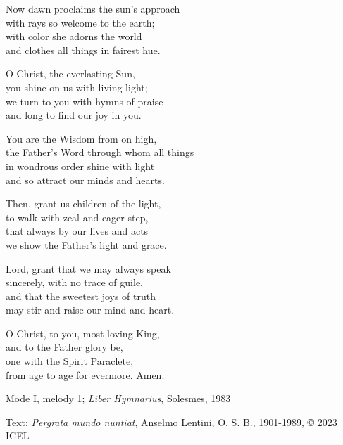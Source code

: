 \hymn

\begin{hymnverse}
Now dawn proclaims the sun’s approach\\
with rays so welcome to the earth;\\
with color she adorns the world\\
and clothes all things in fairest hue.

O Christ, the everlasting Sun,\\
you shine on us with living light;\\
we turn to you with hymns of praise\\
and long to find our joy in you.

You are the Wisdom from on high,\\
the Father’s Word through whom all things\\
in wondrous order shine with light\\
and so attract our minds and hearts.

Then, grant us children of the light,\\
to walk with zeal and eager step,\\
that always by our lives and acts\\
we show the Father’s light and grace.

Lord, grant that we may always speak\\
sincerely, with no trace of guile,\\
and that the sweetest joys of truth\\
may stir and raise our mind and heart.

O Christ, to you, most loving King,\\
and to the Father glory be,\\
one with the Spirit Paraclete,\\
from age to age for evermore. Amen.
\end{hymnverse}

\begin{hymnsource}
Mode I, melody 1; \emph{Liber Hymnarius}, Solesmes, 1983

Text: \emph{Pergrata mundo nuntiat}, Anselmo Lentini, O. S. B., 1901-1989, © 2023 ICEL
\end{hymnsource}
